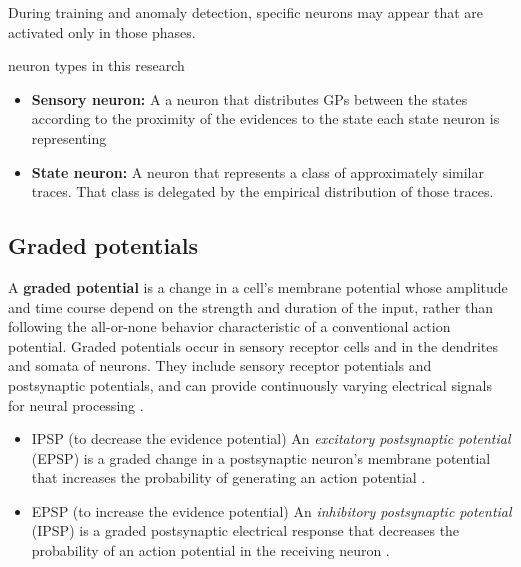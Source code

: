 \documentclass[a4paper]{article}
\begin{document}
            During training and anomaly detection, specific neurons may appear that are activated only in those phases.

            neuron types in this research
            \begin{itemize}
               \item \textbf{Sensory neuron:} A a neuron that distributes GPs between the states according to the proximity of the evidences to the state each state neuron is representing
               \item \textbf{State neuron:} A neuron that represents a class of approximately similar traces. That class is delegated by the empirical distribution of those traces.
            \end{itemize}


      \subsection{Graded potentials}

         A \textbf{graded potential} is a change in a cell's membrane potential whose amplitude and time course depend on the strength and duration of the input, rather than following the all-or-none behavior characteristic of a conventional action potential. Graded potentials occur in sensory receptor cells and in the dendrites and somata of neurons. They include sensory receptor potentials and postsynaptic potentials, and can provide continuously varying electrical signals for neural processing \citep{purves-2001-neuroscience,haag-1998-active-membrane-properties-and-signal-encoding-in-graded-potential-neurons}.

         \begin{itemize}
            \item IPSP (to decrease the evidence potential)  An \emph{excitatory postsynaptic potential} (EPSP) is a graded change in a postsynaptic neuron's membrane potential that increases the probability of generating an action potential \cite{purves-2001-excitatory-and-inhibitory-postsynaptic-potentials,purves-2001-summation-of-synaptic-potentials}.
            \item EPSP (to increase the evidence potential)  An \emph{inhibitory postsynaptic potential} (IPSP) is a graded postsynaptic electrical response that decreases the probability of an action potential in the receiving neuron \cite{purves-2001-excitatory-and-inhibitory-postsynaptic-potentials,purves-2001-summation-of-synaptic-potentials}.
         \end{itemize}
\end{document}
